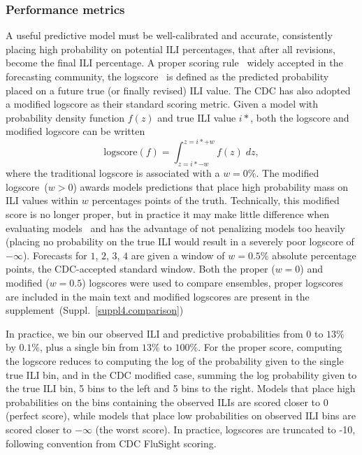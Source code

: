 \documentclass[12pt]{article}
\def\l{\left}
\def\r{\right}
\begin{document}
\subsubsection{Performance metrics} \label{performanceMetrics}
A useful predictive model must be well-calibrated and accurate, consistently placing high probability on potential ILI percentages, that after all revisions, become the final ILI percentage.
A proper scoring rule~\cite{dawid2014theory} widely accepted in the forecasting community, the logscore~\cite{dawid2014theory,reich2019collaborativepnas} is defined as the predicted probability placed on a future true (or finally revised) ILI value.
The CDC has also adopted a modified logscore as their standard scoring metric.
Given a model with probability density function $f(z)$ and true ILI value $i*$, both the logscore and modified logscore can be written
\begin{equation}
  \text{logscore}\l(f\r) = \int_{z = i*-w}^{z=i*+w}f(z)\; dz, \label{analyLogScore}
\end{equation}
where the traditional logscore is associated with a $w=0\%$.
The modified logscore~($w>0$) awards models predictions that place high probability mass on ILI values within $w$ percentages points of the truth.
Technically, this modified score is no longer proper, but in practice it may make little difference when evaluating models~\cite{gneiting2007strictly} and has the advantage of not penalizing models too heavily (placing no probability on the true ILI would result in a severely poor logscore of $-\infty$).
Forecasts for $1$, $2$, $3$, $4$ are given a window of $w=0.5\%$ absolute percentage points, the CDC-accepted standard window.
Both the proper ($w=0$) and modified ($w=0.5$) logscores were used to compare ensembles, proper logscores are included in the main text and modified logscores are present in the supplement~(Suppl.~\ref{suppl4.comparison})

In practice, we bin our observed ILI and predictive probabilities from $0$ to $13\%$ by $0.1\%$, plus a single bin from $13\%$ to $100\%$.
For the proper score, computing the logscore reduces to computing the log of the probability given to the single true ILI bin, and in the CDC modified case, summing the log probability given to the true ILI bin, 5 bins to the left and 5 bins to the right.
Models that place high probabilities on the bins containing the observed ILIs are scored closer to $0$ (perfect score), while models that place low probabilities on observed ILI bins are scored closer to $-\infty$ (the worst score).
In practice, logscores are truncated to -10, following convention from CDC FluSight scoring.\cite{mcgowan2019collaborative}
\end{document}
